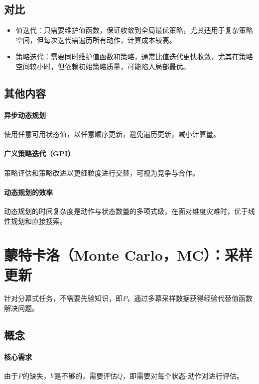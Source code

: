 \documentclass[
12pt, %
a4paper, 
oneside, %
headinclude,footinclude, %
]{scrartcl}
\begin{document}
\subsection{对比}
\begin{itemize}
\item 值迭代：只需要维护值函数，保证收敛到全局最优策略，尤其适用于复杂策略空间，但每次迭代需遍历所有动作，计算成本较高。
\item 策略迭代：需要同时维护值函数和策略，通常比值迭代更快收敛，尤其在策略空间较小时，但依赖初始策略质量，可能陷入局部最优。
\end{itemize}
\subsection{其他内容}
\paragraph{异步动态规划}
使用任意可用状态值，以任意顺序更新，避免遍历更新，减小计算量。
\paragraph{广义策略迭代（GPI）}
策略评估和策略改进以更细粒度进行交替，可视为竞争与合作。
\paragraph{动态规划的效率}
动态规划的时间复杂度是动作与状态数量的多项式级，在面对维度灾难时，优于线性规划和直接搜索。
\section{蒙特卡洛（Monte Carlo，MC）：采样更新}
针对分幕式任务，不需要先验知识，即$ P $，通过多幕采样数据获得经验代替值函数解决问题。
\subsection{概念}
\paragraph{核心需求}
由于$ P $的缺失，$ V $是不够的，需要评估$ Q $，即需要对每个状态-动作对进行评估。
\end{document}
